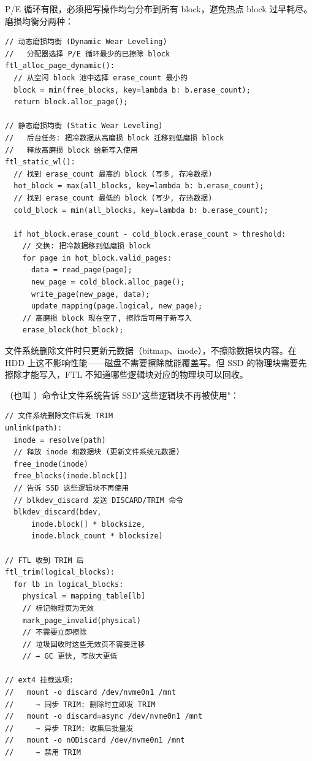 \begin{filesystemlayout}

P/E 循环有限，必须把写操作均匀分布到所有 block，避免热点 block 过早耗尽。磨损均衡分两种：

\begin{lstlisting}
// 动态磨损均衡 (Dynamic Wear Leveling)
//   分配器选择 P/E 循环最少的已擦除 block
ftl_alloc_page_dynamic():
  // 从空闲 block 池中选择 erase_count 最小的
  block = min(free_blocks, key=lambda b: b.erase_count);
  return block.alloc_page();

// 静态磨损均衡 (Static Wear Leveling)
//   后台任务: 把冷数据从高磨损 block 迁移到低磨损 block
//   释放高磨损 block 给新写入使用
ftl_static_wl():
  // 找到 erase_count 最高的 block (写多, 存冷数据)
  hot_block = max(all_blocks, key=lambda b: b.erase_count);
  // 找到 erase_count 最低的 block (写少, 存热数据)
  cold_block = min(all_blocks, key=lambda b: b.erase_count);

  if hot_block.erase_count - cold_block.erase_count > threshold:
    // 交换: 把冷数据移到低磨损 block
    for page in hot_block.valid_pages:
      data = read_page(page);
      new_page = cold_block.alloc_page();
      write_page(new_page, data);
      update_mapping(page.logical, new_page);
    // 高磨损 block 现在空了, 擦除后可用于新写入
    erase_block(hot_block);
\end{lstlisting}


文件系统删除文件时只更新元数据（bitmap、inode），不擦除数据块内容。在 HDD 上这不影响性能——磁盘不需要擦除就能覆盖写。但 SSD 的物理块需要先擦除才能写入，FTL 不知道哪些逻辑块对应的物理块可以回收。

（也叫 ）命令让文件系统告诉 SSD"这些逻辑块不再被使用"：

\begin{lstlisting}
// 文件系统删除文件后发 TRIM
unlink(path):
  inode = resolve(path)
  // 释放 inode 和数据块 (更新文件系统元数据)
  free_inode(inode)
  free_blocks(inode.block[])
  // 告诉 SSD 这些逻辑块不再使用
  // blkdev_discard 发送 DISCARD/TRIM 命令
  blkdev_discard(bdev,
      inode.block[] * blocksize,
      inode.block_count * blocksize)

// FTL 收到 TRIM 后
ftl_trim(logical_blocks):
  for lb in logical_blocks:
    physical = mapping_table[lb]
    // 标记物理页为无效
    mark_page_invalid(physical)
    // 不需要立即擦除
    // 垃圾回收时这些无效页不需要迁移
    // → GC 更快, 写放大更低

// ext4 挂载选项:
//   mount -o discard /dev/nvme0n1 /mnt
//     → 同步 TRIM: 删除时立即发 TRIM
//   mount -o discard=async /dev/nvme0n1 /mnt
//     → 异步 TRIM: 收集后批量发
//   mount -o nODiscard /dev/nvme0n1 /mnt
//     → 禁用 TRIM
\end{lstlisting}


\end{filesystemlayout}
